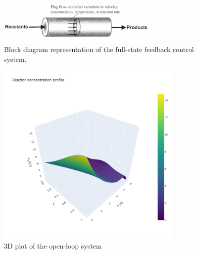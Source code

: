 \begin{figure}[!htbp]
    \centering
    \includegraphics*[width=0.7\textwidth]{Figures/sample.jpeg}
    \caption{Block diagram representation of the full-state feedback control system.}
    \label{fig:block_diagram_observer}
\end{figure}

\begin{figure}[!htbp]
    \centering
    \includegraphics[width=0.8\textwidth]{Figures/3D_x1_openloop.png}
    \caption{3D plot of the open-loop system}
    \label{fig:3D_x1_openloop}
\end{figure}

